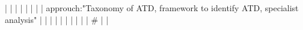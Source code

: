 |    |            |      |                                                                      |                                                                                                                                                                          |                                                                                                                                                                                                                                                            |                                                                                                                                                                                                                                                                      |  approuch:"Taxonomy of ATD, framework to identify ATD, specialist analysis"                                                                                                                                                                                                                              |                                                                                                                                                                                                                                                                                                                                                                                                                                                                                              |
|    |            |      |                                                                      |                                                                                                                                                                          |                                                                                                                                                                                                                                                            |                                                                                                                                                                                                                                                                      |  #                                                                                                                                                                                                                                                                                                       |                                                                                                                                                                                                                                                                                                                                                                                                                                                                                              |
